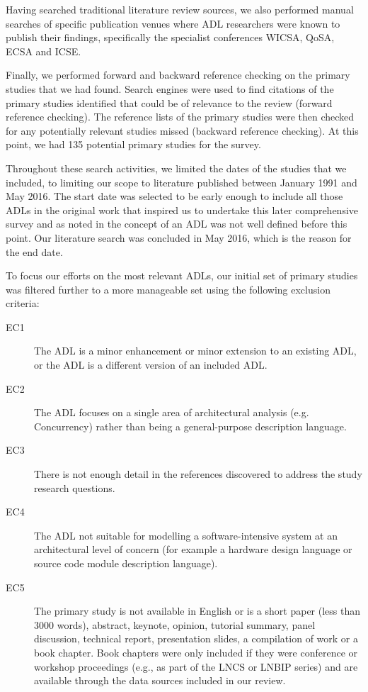 Having searched traditional literature review sources, we also performed manual searches of specific publication venues where ADL researchers were known to publish their findings, specifically the specialist conferences WICSA, QoSA, ECSA and ICSE.

Finally, we performed forward and backward reference checking on the primary studies that we had found. Search engines were used to find citations of the primary studies identified that could be of relevance to the review (forward reference checking). The reference lists of the primary studies were then checked for any potentially relevant studies missed (backward reference checking). At this point, we had 135 potential primary studies for the survey.

Throughout these search activities, we limited the dates of the studies that we included, to limiting our scope to literature published between January 1991 and May 2016. The start date was selected to be early enough to include all those ADLs in the original work \cite{medvidovic2000-adlcomparison} that inspired us to undertake this later comprehensive survey and as noted in \cite{malavolta2013-industryadlneeds} the concept of an ADL was not well defined before this point.  Our literature search was concluded in May 2016, which is the reason for the end date.

To focus our efforts on the most relevant ADLs, our initial set of primary studies was filtered further to a more manageable set using the following exclusion criteria:

\begin{description}
\item[EC1] The ADL is a minor enhancement or minor extension to an existing ADL, or the ADL is a different version of an included ADL.
\item[EC2] The ADL focuses on a single area of architectural analysis (e.g. Concurrency) rather than being a general-purpose description language.
\item[EC3] There is not enough detail in the references discovered to address the study research questions.
\item[EC4] The ADL not suitable for modelling a software-intensive system at an architectural level of concern (for example a hardware design language or source code module description language).
\item[EC5] The primary study is not available in English or is a short paper (less than 3000 words), abstract, keynote, opinion, tutorial summary, panel discussion, technical report, presentation slides, a compilation of work or a book chapter. Book chapters were only included if they were conference or workshop proceedings (e.g., as part of the LNCS or LNBIP series) and are available through the data sources included in our review. 
\end{description}

